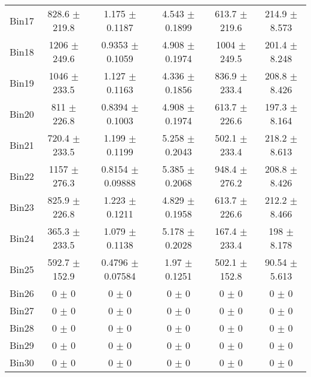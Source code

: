 \begin{tabular}{@{\extracolsep{4pt}}lccccc@{}}
     Bin17 & 828.6 $\pm$ 219.8 & 1.175 $\pm$ 0.1187 & 4.543 $\pm$ 0.1899 & 613.7 $\pm$ 219.6 & 214.9 $\pm$ 8.573 \\ 
     Bin18 & 1206 $\pm$ 249.6 & 0.9353 $\pm$ 0.1059 & 4.908 $\pm$ 0.1974 & 1004 $\pm$ 249.5 & 201.4 $\pm$ 8.248 \\ 
     Bin19 & 1046 $\pm$ 233.5 & 1.127 $\pm$ 0.1163 & 4.336 $\pm$ 0.1856 & 836.9 $\pm$ 233.4 & 208.8 $\pm$ 8.426 \\ 
     Bin20 & 811 $\pm$ 226.8 & 0.8394 $\pm$ 0.1003 & 4.908 $\pm$ 0.1974 & 613.7 $\pm$ 226.6 & 197.3 $\pm$ 8.164 \\ 
     Bin21 & 720.4 $\pm$ 233.5 & 1.199 $\pm$ 0.1199 & 5.258 $\pm$ 0.2043 & 502.1 $\pm$ 233.4 & 218.2 $\pm$ 8.613 \\ 
     Bin22 & 1157 $\pm$ 276.3 & 0.8154 $\pm$ 0.09888 & 5.385 $\pm$ 0.2068 & 948.4 $\pm$ 276.2 & 208.8 $\pm$ 8.426 \\ 
     Bin23 & 825.9 $\pm$ 226.8 & 1.223 $\pm$ 0.1211 & 4.829 $\pm$ 0.1958 & 613.7 $\pm$ 226.6 & 212.2 $\pm$ 8.466 \\ 
     Bin24 & 365.3 $\pm$ 233.5 & 1.079 $\pm$ 0.1138 & 5.178 $\pm$ 0.2028 & 167.4 $\pm$ 233.4 & 198 $\pm$ 8.178 \\ 
     Bin25 & 592.7 $\pm$ 152.9 & 0.4796 $\pm$ 0.07584 & 1.97 $\pm$ 0.1251 & 502.1 $\pm$ 152.8 & 90.54 $\pm$ 5.613 \\ 
     Bin26 & 0 $\pm$ 0 & 0 $\pm$ 0 & 0 $\pm$ 0 & 0 $\pm$ 0 & 0 $\pm$ 0 \\ 
     Bin27 & 0 $\pm$ 0 & 0 $\pm$ 0 & 0 $\pm$ 0 & 0 $\pm$ 0 & 0 $\pm$ 0 \\ 
     Bin28 & 0 $\pm$ 0 & 0 $\pm$ 0 & 0 $\pm$ 0 & 0 $\pm$ 0 & 0 $\pm$ 0 \\ 
     Bin29 & 0 $\pm$ 0 & 0 $\pm$ 0 & 0 $\pm$ 0 & 0 $\pm$ 0 & 0 $\pm$ 0 \\ 
     Bin30 & 0 $\pm$ 0 & 0 $\pm$ 0 & 0 $\pm$ 0 & 0 $\pm$ 0 & 0 $\pm$ 0 \\ 
\hline\hline
  \end{tabular}
